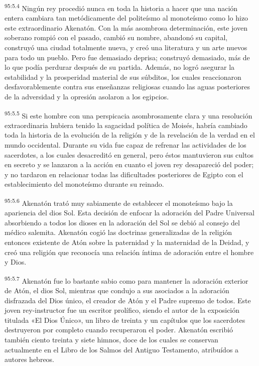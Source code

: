 \par
\textsuperscript{95:5.4} Ningún rey procedió nunca en toda la historia a hacer que una nación entera cambiara tan metódicamente del politeísmo al monoteísmo como lo hizo este extraordinario Akenatón. Con la más asombrosa determinación, este joven soberano rompió con el pasado, cambió su nombre, abandonó su capital, construyó una ciudad totalmente nueva, y creó una literatura y un arte nuevos para todo un pueblo. Pero fue demasiado deprisa; construyó demasiado, más de lo que podía perdurar después de su partida. Además, no logró asegurar la estabilidad y la prosperidad material de sus súbditos, los cuales reaccionaron desfavorablemente contra sus enseñanzas religiosas cuando las aguas posteriores de la adversidad y la opresión asolaron a los egipcios.

\par
\textsuperscript{95:5.5} Si este hombre con una perspicacia asombrosamente clara y una resolución extraordinaria hubiera tenido la sagacidad política de Moisés, habría cambiado toda la historia de la evolución de la religión y de la revelación de la verdad en el mundo occidental. Durante su vida fue capaz de refrenar las actividades de los sacerdotes, a los cuales desacreditó en general, pero éstos mantuvieron sus cultos en secreto y se lanzaron a la acción en cuanto el joven rey desapareció del poder; y no tardaron en relacionar todas las dificultades posteriores de Egipto con el establecimiento del monoteísmo durante su reinado.

\par
\textsuperscript{95:5.6} Akenatón trató muy sabiamente de establecer el monoteísmo bajo la apariencia del dios Sol. Esta decisión de enfocar la adoración del Padre Universal absorbiendo a todos los dioses en la adoración del Sol se debió al consejo del médico salemita. Akenatón cogió las doctrinas generalizadas de la religión entonces existente de Atón sobre la paternidad y la maternidad de la Deidad, y creó una religión que reconocía una relación íntima de adoración entre el hombre y Dios.

\par
\textsuperscript{95:5.7} Akenatón fue lo bastante sabio como para mantener la adoración exterior de Atón, el dios Sol, mientras que condujo a sus asociados a la adoración disfrazada del Dios único, el creador de Atón y el Padre supremo de todos. Este joven rey-instructor fue un escritor prolífico, siendo el autor de la exposición titulada «El Dios Único», un libro de treinta y un capítulos que los sacerdotes destruyeron por completo cuando recuperaron el poder. Akenatón escribió también ciento treinta y siete himnos, doce de los cuales se conservan actualmente en el Libro de los Salmos del Antiguo Testamento, atribuídos a autores hebreos.

